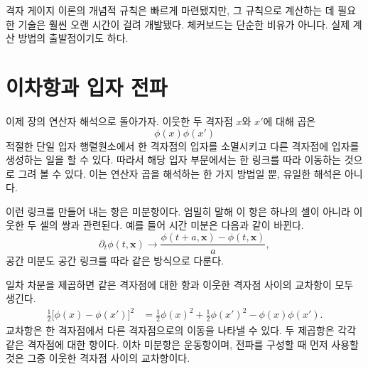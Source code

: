 격자 게이지 이론의 개념적 규칙은 빠르게 마련됐지만, 그 규칙으로 계산하는 데 필요한 기술은 훨씬 오랜 시간이 걸려 개발됐다. 체커보드는 단순한 비유가 아니다. 실제 계산 방법의 출발점이기도 하다.

\section{이차항과 입자 전파}

이제 장의 연산자 해석으로 돌아가자. 이웃한 두 격자점 \(x\)와 \(x'\)에 대해 곱은\begin{equation}
\phi(x)\phi(x')
\end{equation}적절한 단일 입자 행렬원소에서 한 격자점의 입자를 소멸시키고 다른 격자점에 입자를 생성하는 일을 할 수 있다. 따라서 해당 입자 부문에서는 한 링크를 따라 이동하는 것으로 그려 볼 수 있다. 이는 연산자 곱을 해석하는 한 가지 방법일 뿐, 유일한 해석은 아니다.

이런 링크를 만들어 내는 항은 미분항이다. 엄밀히 말해 이 항은 하나의 셀이 아니라 이웃한 두 셀의 쌍과 관련된다. 예를 들어 시간 미분은 다음과 같이 바뀐다.\begin{equation}
\partial_t\phi(t,\mathbf{x})
\longrightarrow
\frac{\phi(t+a,\mathbf{x})-\phi(t,\mathbf{x})}{a},
\end{equation}공간 미분도 공간 링크를 따라 같은 방식으로 다룬다.

\begin{classroomqa}
\end{classroomqa}

일차 차분을 제곱하면 같은 격자점에 대한 항과 이웃한 격자점 사이의 교차항이 모두 생긴다.\begin{align}
\frac{1}{2}\bigl[\phi(x)-\phi(x')\bigr]^2
&=
\frac{1}{2}\phi(x)^2
+\frac{1}{2}\phi(x')^2
-\phi(x)\phi(x').
\end{align}교차항은 한 격자점에서 다른 격자점으로의 이동을 나타낼 수 있다. 두 제곱항은 각각 같은 격자점에 대한 항이다. 이차 미분항은 운동항이며, 전파를 구성할 때 먼저 사용할 것은 그중 이웃한 격자점 사이의 교차항이다.


